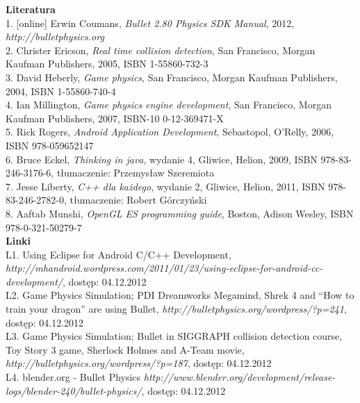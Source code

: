 {\Large \textbf{Literatura}} \\


1. [online] Erwin Coumans, \emph{Bullet 2.80 Physics SDK Manual}, 2012,
\emph{http://bulletphysics.org} \\

2. Christer Ericson, \emph{Real time collision detection}, San Francisco, Morgan
Kaufman Publishers, 2005, ISBN 1-55860-732-3 \\

3. David Heberly, \emph{Game physics}, San Francisco, Morgan
Kaufman Publishers, 2004, ISBN 1-55860-740-4 \\

4. Ian Millington, \emph{Game physics engine development}, San Francisco, Morgan
Kaufman Publishers, 2007, ISBN-10 0-12-369471-X \\

5. Rick Rogers, \emph{Android Application Development}, Sebastopol, O'Relly,
2006, ISBN 978-059652147 \\

6. Bruce Eckel, \emph{Thinking in java}, wydanie 4, Gliwice, Helion, 2009, ISBN
978-83-246-3176-6, tłumaczenie: Przemysław Szeremiota \\

7. Jesse Liberty, \emph{C++ dla każdego}, wydanie 2, Gliwice, Helion, 2011, ISBN
978-83-246-2782-0, tłumaczenie: Robert Górczyński \\

8. Aaftab Munshi, \emph{OpenGL ES programming guide}, Boston, Adison Wesley,
ISBN 978-0-321-50279-7 \\

{\Large \textbf{Linki}} \\


L1. Using Eclipse for Android C/C++ Development,
\emph{http://mhandroid.wordpress.com/2011/01/23/using-eclipse-for-android-cc-development/},
dostęp: 04.12.2012\\

L2.
Game Physics Simulation; PDI Dreamworks Megamind, Shrek 4 and ``How
to train your dragon'' are using Bullet,
\emph{http://bulletphysics.org/wordpress/?p=241}, dostęp: 04.12.2012\\
\newpage
L3. Game Physics Simulation; Bullet in SIGGRAPH collision detection
course, Toy Story 3 game, Sherlock Holmes and A-Team
movie, \emph{http://bulletphysics.org/wordpress/?p=187}, dostęp: 04.12.2012\\

L4. blender.org - Bullet Physics
\emph{http://www.blender.org/development/release-logs/blender-240/bullet-physics/},
dostęp: 04.12.2012\\

